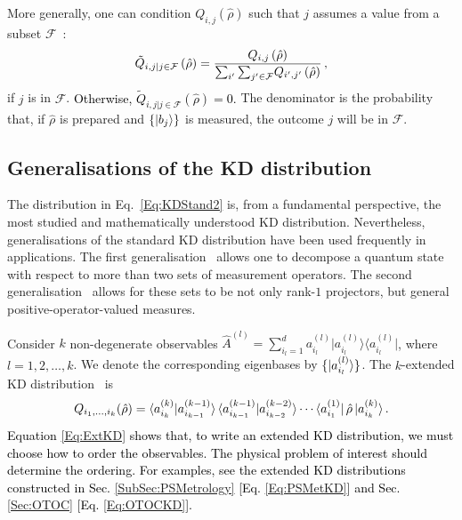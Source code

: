 \documentclass[%
 reprint,
superscriptaddress,
nofootinbib,
bibnotes,
 amsmath,amssymb,
 aps,
]{revtex4-1}
\theoremstyle{plain}
\newcommand*{\ketbra}[2]{\lvert #1 \rangle\!\langle #2 \rvert}
\newcommand{\Dave}[1]{\textcolor{black}{#1} }
\newcommand{\nicole}[1]{\textcolor{black}{#1} }
\begin{document}
More generally, one can condition $Q_{i,j} \left( \hat{\rho} \right) $ 
such that $j$ assumes a value from a subset $\mathcal{F}$~\cite{ArvidssonShukur20, Jenne22}: 
\begin{equation}
\label{Eq:KDBayesExt}
\tilde{Q}_{i,j|j\in \mathcal{F} } \left( \hat{\rho} \right) =  \frac{    Q_{i,j} \left( \hat{\rho} \right)  }{ 
\nicole{ \sum_{ i^{\prime} }  \sum_{ j^{\prime} \in \mathcal{F} }
}
Q_{i^{\prime},j^{\prime}} \left( \hat{\rho} \right)  } \, ,
\end{equation}
if $j$ is in $\mathcal{F}$. \Dave{Otherwise,  $\tilde{Q}_{i,j|j\in \mathcal{F} } \left( \hat{\rho} \right) = 0$.} 
The denominator is the probability that, if $\hat{\rho}$ is prepared and $\{ \ket{b_j} \}$ is measured, the outcome $j$ will be in $\mathcal{F}$.



\subsection{Generalisations of the KD distribution}
\label{SubSec:GeneralKD}

The distribution in Eq.~\eqref{Eq:KDStand2} is, from a fundamental perspective, the most studied and mathematically understood KD distribution. Nevertheless, 
generalisations of the standard KD distribution
have been used frequently 
in applications. The first generalisation~\cite{Kirkwood33, Dirac45} allows one to decompose a quantum state with respect to more than two sets of measurement operators. The second generalisation~\cite{NYH_quasiprobability_2018, ArvidssonShukur2021, Lupu22} allows for these sets to be not only rank-$1$ projectors, but general positive-operator-valued  measures.  

Consider $k$ non-degenerate observables $\hat{A}^{(l)}=\sum_{i_l=1}^d a_{i_l}^{(l)} \ketbra{a_{i_l}^{(l)}} {a_{i_l}^{(l)}}$, where $l = 1, 2, \ldots, k$. 
We denote the corresponding eigenbases by $ \{ \ket{a_{i_l}^{(l)}}\}$.  The $k$-extended KD distribution~\cite{NYH_quasiprobability_2018} is 
\begin{equation}
\label{Eq:ExtKD}
Q_{i_1,\ldots,i_k} (\hat{\rho}) = \braket{a_{i_k}^{(k)} | a_{i_{k-1}}^{(k-1)}} \braket{a_{i_{k-1}}^{(k-1)} | a_{i_{k-2}}^{(k-2)}} \cdots \bra{a_{i_{1}}^{(1)}} \hat{\rho} \ket{a_{i_{k}}^{(k)}} .
\end{equation}
\Dave{Equation \eqref{Eq:ExtKD} shows that, to write an extended KD distribution, we must choose how to order the observables. The physical problem of interest should determine the ordering. For examples, see the extended KD distributions constructed in Sec.  \ref{SubSec:PSMetrology} [Eq. \eqref{Eq:PSMetKD}] and Sec. \ref{Sec:OTOC} [Eq.  \eqref{Eq:OTOCKD}].}
\end{document}
